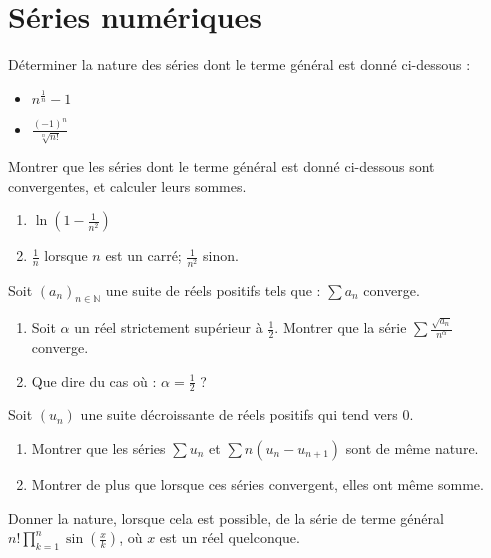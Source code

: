 \section{S\'eries num\'eriques}

\begin{exer}
D\'eterminer la nature des s\'eries dont le terme g\'en\'eral est donn\'e ci-dessous :
\begin{itemize}
\item $n^{\frac{1}{n}}-1$
\item $\frac{(-1)^n}{\sqrt[n]{n!}}$
\end{itemize}
\end{exer}

\begin{exer}
Montrer que les s\'eries dont le terme g\'en\'eral est donn\'e ci-dessous sont convergentes, et calculer leurs sommes.
\begin{enumerate}
\item $\ln(1-\frac{1}{n^2})$
\item $\frac{1}{n}$ lorsque $n$ est un carr\'e; $\frac{1}{n^2}$ sinon.
\end{enumerate}
\end{exer}

\begin{exer}
Soit $(a_n)_{n \in \mathbb{N}}$ une suite de r\'eels positifs tels que : $\sum a_n$ converge.
\begin{enumerate}
\item Soit $\alpha$ un r\'eel strictement sup\'erieur \`a $\frac{1}{2}$. %
Montrer que la s\'erie $\sum \frac{\sqrt{a_n}}{n^{\alpha}}$ converge.
\item Que dire du cas o\`u : $\alpha = \frac{1}{2}$ ?
\end{enumerate}
\end{exer}

\begin{exer}
Soit $(u_n)$ une suite décroissante de réels positifs qui tend vers $0$.
\begin{enumerate}
\item Montrer que les séries $\sum u_n$ et $\sum n(u_n - u_{n+1})$ sont de même nature.
\item Montrer de plus que lorsque ces séries convergent, elles ont même somme.
\end{enumerate}
\end{exer}

\begin{exer}
Donner la nature, lorsque cela est possible, de la série de terme général $n! \prod_{k=1}^n \sin(\frac{x}{k})$, %
où $x$ est un réel quelconque.
\end{exer}

